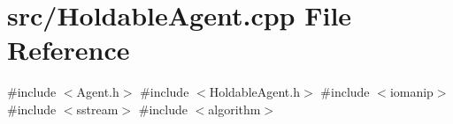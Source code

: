 \section{src/\+Holdable\+Agent.cpp File Reference}
\label{_holdable_agent_8cpp}
{\ttfamily \#include $<$Agent.\+h$>$}\newline
{\ttfamily \#include $<$Holdable\+Agent.\+h$>$}\newline
{\ttfamily \#include $<$iomanip$>$}\newline
{\ttfamily \#include $<$sstream$>$}\newline
{\ttfamily \#include $<$algorithm$>$}\newline
